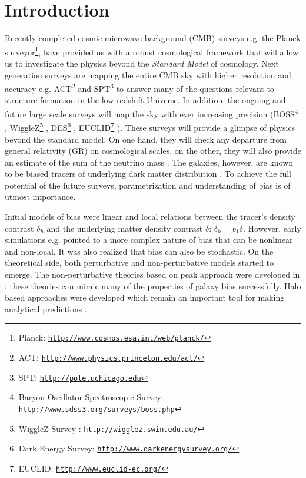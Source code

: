 \section{Introduction}
\label{sec:intro}

Recently completed cosmic microwave background (CMB) surveys e.g. the 
Planck surveyor\footnote{Planck: \href{http://www.cosmos.esa.int/web/planck/}
{\tt  http://www.cosmos.esa.int/web/planck/}}, have provided us with a robust cosmological framework 
that will allow us to investigate the physics beyond the {\em Standard Model} of cosmology.
Next generation surveys are mapping the entire CMB sky with higher resolution and accuracy
e.g. ACT\footnote{ACT: \href{http://www.physics.princeton.edu/act/}{\tt http://www.physics.princeton.edu/act/}} and
SPT\footnote{SPT: \href{http://pole.uchicago.edu/}{\tt http://pole.uchicago.edu}} to answer many of the
questions relevant to structure formation in the low redshift Universe.
In addition, the ongoing and future large scale surveys will map the sky with ever increasing precision
(BOSS\footnote{Baryon Oscillator Spectroscopic Survey: \href{http://www.sdss3.org/surveys/boss.php}{\tt http://www.sdss3.org/surveys/boss.php}}
\citep{EW},
WiggleZ\footnote{WiggleZ Survey : \href{http://wigglez.swin.edu.au/}{\tt http://wigglez.swin.edu.au/}}
\citep{DJA},
DES\footnote{Dark Energy Survey: \href{http://www.darkenergysurvey.org/}{\tt http://www.darkenergysurvey.org/}}
\citep{DES},
EUCLID\footnote{EUCLID: \href{http://www.euclid-ec.org/}{\tt http://www.euclid-ec.org/}}
\citep{LAA}). These surveys will provide a glimpse of physics beyond the standard model.
On one hand, they will check any departure from general relativity (GR) on cosmological scales,
on the other, they will also provide an estimate of the sum of the neutrino mass \citep{review2}. 
The galaxies, however, are known to be biased tracers of underlying dark matter distribution \citep{Desjacques}.
To achieve the full potential of the future surveys, parametrization and
understanding of bias is of utmost importance.

Initial models of bias were linear and local relations
between the tracer's density contrast $\delta_h$ and the underlying matter density contrast $\delta$:  $\delta_h=b_1\delta$.
However, early simulations e.g. \citep{CenOstriker} pointed to a more complex nature of bias that can
be nonlinear and non-local. It was also realized that bias can also be stochastic. 
On the theoretical side, both perturbative and non-perturbative models started to emerge.
The non-perturbative theories based on peak approach were developed in \citep{BBKS};
these theories can mimic many of the properties of galaxy bias successfully. 
Halo based approaches were developed which remain an important tool for making
analytical predictions \citep{CooraySheth}.

